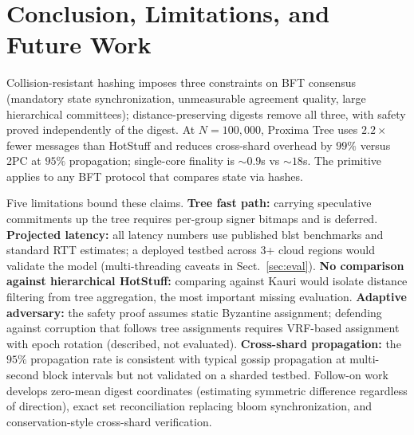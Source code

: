 \documentclass[runningheads]{llncs}
\begin{document}
\section{Conclusion, Limitations, and Future Work}
\label{sec:limitations}

Collision-resistant hashing imposes three constraints on BFT consensus (mandatory state synchronization, unmeasurable agreement quality, large hierarchical committees); distance-preserving digests remove all three, with safety proved independently of the digest. At $N{=}100{,}000$, Proxima Tree uses $2.2\times$ fewer messages than HotStuff and reduces cross-shard overhead by $99\%$ versus 2PC at $95\%$ propagation; single-core finality is $\sim\!0.9$s vs $\sim\!18$s. The primitive applies to any BFT protocol that compares state via hashes.

 Five limitations bound these claims. \textbf{Tree fast path:} carrying speculative commitments up the tree requires per-group signer bitmaps and is deferred. \textbf{Projected latency:} all latency numbers use published blst benchmarks and standard RTT estimates; a deployed testbed across 3+ cloud regions would validate the model (multi-threading caveats in Sect.~\ref{sec:eval}). \textbf{No comparison against hierarchical HotStuff:} comparing against Kauri would isolate distance filtering from tree aggregation, the most important missing evaluation. \textbf{Adaptive adversary:} the safety proof assumes static Byzantine assignment; defending against corruption that follows tree assignments requires VRF-based assignment with epoch rotation (described, not evaluated). \textbf{Cross-shard propagation:} the $95\%$ propagation rate is consistent with typical gossip propagation at multi-second block intervals but not validated on a sharded testbed. Follow-on work develops zero-mean digest coordinates (estimating symmetric difference regardless of direction), exact set reconciliation replacing bloom synchronization, and conservation-style cross-shard verification.



\end{document}
